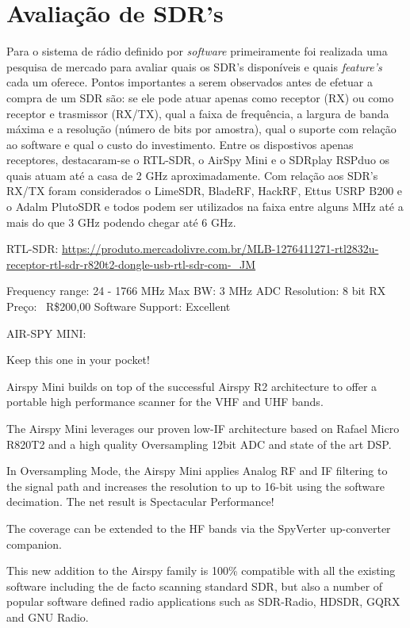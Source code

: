 \documentclass[
  12pt,				%
  openright,			%
  twoside,			%
  a4paper,			%
  english,			%
  french,				%
  spanish,			%
  brazil,				%
  ]{abntex2}
\begin{document}
\section*{Avaliação de SDR's}

Para o sistema de rádio definido por \textit{software} primeiramente foi realizada uma pesquisa de mercado para avaliar quais os SDR's disponíveis e quais
\textit{feature's} cada um oferece. Pontos importantes a serem observados antes de efetuar a compra de um SDR são: se ele pode atuar apenas como receptor
(RX) ou como receptor e trasmissor (RX/TX), qual a faixa de frequência, a largura de banda máxima e a resolução (número de bits por amostra), qual o suporte
com relação ao software e qual o custo do investimento. Entre os dispostivos apenas receptores, destacaram-se o RTL-SDR, o AirSpy Mini e o SDRplay RSPduo
os quais atuam até a casa de 2 GHz aproximadamente. Com relação aos SDR's RX/TX foram considerados o LimeSDR, BladeRF, HackRF, Ettus USRP B200 e o
Adalm PlutoSDR e todos podem ser utilizados na faixa entre alguns MHz até a mais do que 3 GHz podendo chegar até 6 GHz.

RTL-SDR: \href{https://produto.mercadolivre.com.br/MLB-1276411271-rtl2832u-receptor-rtl-sdr-r820t2-dongle-usb-rtl-sdr-com-_JM}{https://produto.mercadolivre.com.br/MLB-1276411271-rtl2832u-receptor-rtl-sdr-r820t2-dongle-usb-rtl-sdr-com-\_JM}

Frequency range: 24 - 1766 MHz
Max BW: 3 MHz
ADC Resolution: 8 bit
RX
Preço: ~R\$200,00
Software Support: Excellent


AIR-SPY MINI:

Keep this one in your pocket!

Airspy Mini builds on top of the successful Airspy R2 architecture to offer a portable high performance scanner for the VHF and UHF bands.

The Airspy Mini leverages our proven low-IF architecture based on Rafael Micro R820T2 and a high quality Oversampling 12bit ADC and state of the art DSP.

In Oversampling Mode, the Airspy Mini applies Analog RF and IF filtering to the signal path and increases the resolution to up to 16-bit using the software decimation. The net result is Spectacular Performance!

The coverage can be extended to the HF bands via the SpyVerter up-converter companion.

This new addition to the Airspy family is 100\% compatible with all the existing software including the de facto scanning standard SDR, but also a number of popular software defined radio applications such as SDR-Radio, HDSDR, GQRX and GNU Radio.
\end{document}

